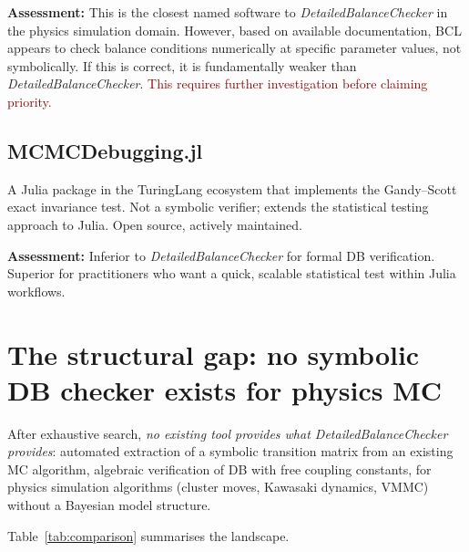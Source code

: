 \documentclass[11pt,a4paper]{article}
\newcommand{\bad}[1]{\textcolor{darkred}{#1}}
\newcommand{\DBC}{\textit{DetailedBalanceChecker}}
\begin{document}
\textbf{Assessment:}  This is the closest named software to \DBC{} in the physics
simulation domain.  However, based on available documentation, BCL appears to
check balance conditions numerically at specific parameter values, not symbolically.
If this is correct, it is fundamentally weaker than \DBC{}.
\bad{This requires further investigation before claiming priority.}

\subsection{MCMCDebugging.jl}

A Julia package in the TuringLang ecosystem that implements the
Gandy--Scott exact invariance test.  Not a symbolic verifier; extends the
statistical testing approach to Julia.  Open source, actively maintained.

\textbf{Assessment:}  Inferior to \DBC{} for formal DB verification.  Superior
for practitioners who want a quick, scalable statistical test within Julia workflows.

\section{The structural gap: no symbolic DB checker exists for physics MC}
\label{sec:gap}

After exhaustive search, \emph{no existing tool provides what \DBC{} provides}:
automated extraction of a symbolic transition matrix from an existing MC algorithm,
algebraic verification of DB with free coupling constants, for physics simulation
algorithms (cluster moves, Kawasaki dynamics, VMMC) without a Bayesian model
structure.

Table~\ref{tab:comparison} summarises the landscape.
\end{document}
